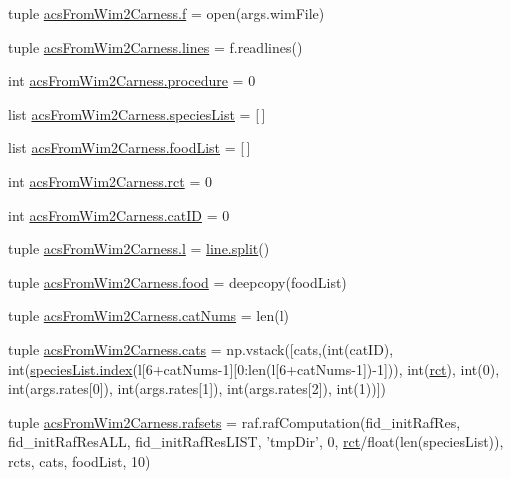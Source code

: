 \begin{DoxyCompactItemize}
\item 
tuple \hyperlink{a00128_ab599c65fad60b9c6ccc220002ce8f89c}{acs\+From\+Wim2\+Carness.\+f} = open(args.\+wim\+File)
\item 
tuple \hyperlink{a00128_a2a83f40b2aa2cbcbd487195fef9af340}{acs\+From\+Wim2\+Carness.\+lines} = f.\+readlines()
\item 
int \hyperlink{a00128_ac84174dad0b933ca88ebdb79cf3497ec}{acs\+From\+Wim2\+Carness.\+procedure} = 0
\item 
list \hyperlink{a00128_aff8baae5d4cd1678204477dd5e620775}{acs\+From\+Wim2\+Carness.\+species\+List} = \mbox{[}$\,$\mbox{]}
\item 
list \hyperlink{a00128_a878da371fd02e9515fe7305e0a57be09}{acs\+From\+Wim2\+Carness.\+food\+List} = \mbox{[}$\,$\mbox{]}
\item 
int \hyperlink{a00128_a61159eb5aec77b97808ce3fb742d8f6d}{acs\+From\+Wim2\+Carness.\+rct} = 0
\item 
int \hyperlink{a00128_a92a1d1f6272fbef428680bed82dd37e7}{acs\+From\+Wim2\+Carness.\+cat\+I\+D} = 0
\item 
tuple \hyperlink{a00128_a0437cd4d2a377ca0e34ab59f4bfd833f}{acs\+From\+Wim2\+Carness.\+l} = \hyperlink{a00059_a4d1aa74fac80ae0275c056575fdb6626}{line.\+split}()
\item 
tuple \hyperlink{a00128_aee9290533a24e96dbde7c8e71055497f}{acs\+From\+Wim2\+Carness.\+food} = deepcopy(food\+List)
\item 
tuple \hyperlink{a00128_a0d474343423a1a87a760dd91411f96b4}{acs\+From\+Wim2\+Carness.\+cat\+Nums} = len(l)
\item 
tuple \hyperlink{a00128_aea4d714ca7ceaba151380b3aed7c34d8}{acs\+From\+Wim2\+Carness.\+cats} = np.\+vstack(\mbox{[}cats,(int(cat\+I\+D), int(\hyperlink{a00102_a0cd6a44ffb07342cbc7e5ac33bfc9495}{species\+List.\+index}(l\mbox{[}6+cat\+Nums-\/1\mbox{]}\mbox{[}0\+:len(l\mbox{[}6+cat\+Nums-\/1\mbox{]})-\/1\mbox{]})), int(\hyperlink{a00028_a188d6e4d5a19aaeb1532fc5b9791afba}{rct}), int(0), int(args.\+rates\mbox{[}0\mbox{]}), int(args.\+rates\mbox{[}1\mbox{]}), int(args.\+rates\mbox{[}2\mbox{]}), int(1))\mbox{]})
\item 
tuple \hyperlink{a00128_a36370edf2a6a4e19f0a99413aac43096}{acs\+From\+Wim2\+Carness.\+rafsets} = raf.\+raf\+Computation(fid\+\_\+init\+Raf\+Res, fid\+\_\+init\+Raf\+Res\+A\+L\+L, fid\+\_\+init\+Raf\+Res\+L\+I\+S\+T, 'tmp\+Dir', 0, \hyperlink{a00028_a188d6e4d5a19aaeb1532fc5b9791afba}{rct}/float(len(species\+List)), rcts, cats, food\+List, 10)
\item 

\end{DoxyCompactItemize}
